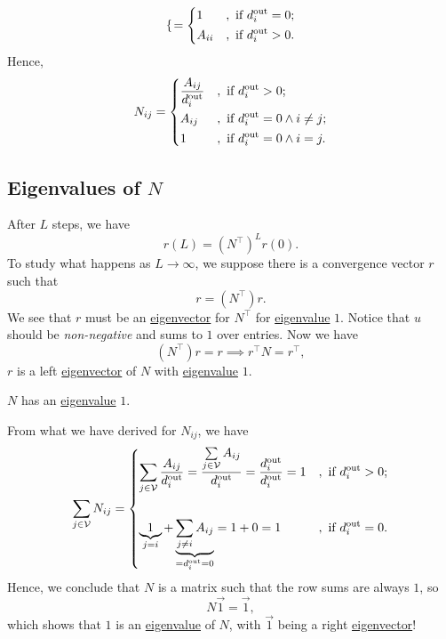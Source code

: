 \begin{enumerate}[(a)]
\[\begin{alignedat}{3}
\begin{dcases}
			      \end{dcases} &&= \begin{dcases}
				      1      & , \text{ if } d_{i}^{\text{out}} = 0; \\
				      A_{ii} & , \text{ if } d_{i}^{\text{out}} > 0. \\
			      \end{dcases}
		      \end{alignedat}
	      \]
	      Hence,
	      \[
		      N_{ij} = \begin{dcases}
			      \frac{A_{ij}}{d_{i}^{\text{out}}} & , \text{ if } d_{i}^{\text{out}} > 0;              \\
			      A_{ij}                            & , \text{ if }d_{i}^{\text{out}} = 0 \land i\neq j; \\
			      1                                 & , \text{ if }d_{i}^{\text{out}} = 0 \land i= j.    \\
		      \end{dcases}
	      \]
\end{enumerate}

\subsection{Eigenvalues of \(N\)}
After \(L\) steps, we have
\[
	r(L) = (N^{\top})^L r(0).
\]
To study what happens as \(L\to \infty\), we suppose there is a convergence vector \(r\) such that
\[
	r = (N^{\top})r.
\]
We see that \(r\) must be an \hyperref[def:eigenvector]{eigenvector} for \(N^{\top}\) for \hyperref[def:eigenvalue]{eigenvalue} \(1\). Notice that \(u\) should be
\emph{non-negative} and sums to \(1\) over entries. Now we have
\[
	(N^{\top})r = r \implies r^{\top}N = r^{\top},
\]
\(r\) is a left \hyperref[def:eigenvector]{eigenvector} of \(N\) with \hyperref[def:eigenvalue]{eigenvalue} \(1\).
\begin{note}
	\(N\) has an \hyperref[def:eigenvalue]{eigenvalue} \(1\).
\end{note}
\begin{explanation}

	From what we have derived for \(N_{ij} \), we have
	\[
		\sum\limits_{j\in\mathcal{V}}N_{ij} = \begin{dcases}
			\sum\limits_{j\in\mathcal{V}} \frac{A_{ij}}{d_{i}^{\text{out}}} = \frac{\sum\limits_{j\in\mathcal{V}} A_{ij} }{d_{i}^{\text{out}}} = \frac{d_{i}^{\text{out}}}{d_{i}^{\text{out}}}= 1 & , \text{ if }d_{i}^{\text{out}} > 0; \\\\
			\underbrace{1}_{j = i} + \underbrace{\sum\limits_{j\neq i} A_{ij}}_{ = d_{i}^{\text{out}} = 0} = 1 + 0 = 1                                                                            & , \text{ if }d_{i}^{\text{out}} = 0. \\
		\end{dcases}
	\]
	Hence, we conclude that \(N\) is a matrix such that the row sums are always \(1\), so
	\[
		N \vec{1} = \vec{1},
	\]
	which shows that \(1\) is an \hyperref[def:eigenvalue]{eigenvalue} of \(N\), with \(\vec{1}\) being a right \hyperref[def:eigenvector]{eigenvector}!
\end{explanation}

